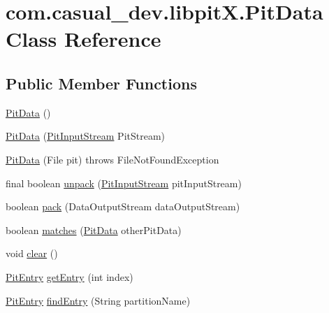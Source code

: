 \hypertarget{classcom_1_1casual__dev_1_1libpitX_1_1PitData}{\section{com.\-casual\-\_\-dev.\-libpit\-X.\-Pit\-Data Class Reference}
\label{classcom_1_1casual__dev_1_1libpitX_1_1PitData}
}
\subsection*{Public Member Functions}
\begin{DoxyCompactItemize}
\item 
\hyperlink{classcom_1_1casual__dev_1_1libpitX_1_1PitData_a72404a581db05242899de5b20829397f}{Pit\-Data} ()
\item 
\hyperlink{classcom_1_1casual__dev_1_1libpitX_1_1PitData_ad59e327e63bd5124602a568c07b03c83}{Pit\-Data} (\hyperlink{classcom_1_1casual__dev_1_1libpitX_1_1PitInputStream}{Pit\-Input\-Stream} Pit\-Stream)
\item 
\hyperlink{classcom_1_1casual__dev_1_1libpitX_1_1PitData_a14b344a02bf51eda6249aed851ee60e3}{Pit\-Data} (File pit)  throws File\-Not\-Found\-Exception 
\item 
final boolean \hyperlink{classcom_1_1casual__dev_1_1libpitX_1_1PitData_a9bd057201d931c4c013112bc9fc001cd}{unpack} (\hyperlink{classcom_1_1casual__dev_1_1libpitX_1_1PitInputStream}{Pit\-Input\-Stream} pit\-Input\-Stream)
\item 
boolean \hyperlink{classcom_1_1casual__dev_1_1libpitX_1_1PitData_a2226a51b2f752fc5e5f7f9fa49000f2e}{pack} (Data\-Output\-Stream data\-Output\-Stream)
\item 
boolean \hyperlink{classcom_1_1casual__dev_1_1libpitX_1_1PitData_a2ad3b955bde05da162be4447058c7d5e}{matches} (\hyperlink{classcom_1_1casual__dev_1_1libpitX_1_1PitData}{Pit\-Data} other\-Pit\-Data)
\item 
void \hyperlink{classcom_1_1casual__dev_1_1libpitX_1_1PitData_a9a809b7293bbdc825730d88f7e862696}{clear} ()
\item 
\hyperlink{classcom_1_1casual__dev_1_1libpitX_1_1PitEntry}{Pit\-Entry} \hyperlink{classcom_1_1casual__dev_1_1libpitX_1_1PitData_a8026048cec0b3d1a82b4f5eeff544b8f}{get\-Entry} (int index)
\item 
\hyperlink{classcom_1_1casual__dev_1_1libpitX_1_1PitEntry}{Pit\-Entry} \hyperlink{classcom_1_1casual__dev_1_1libpitX_1_1PitData_ad217cc1f0d88f0bd99d0a8145d977e01}{find\-Entry} (String partition\-Name)

\end{DoxyCompactItemize}

